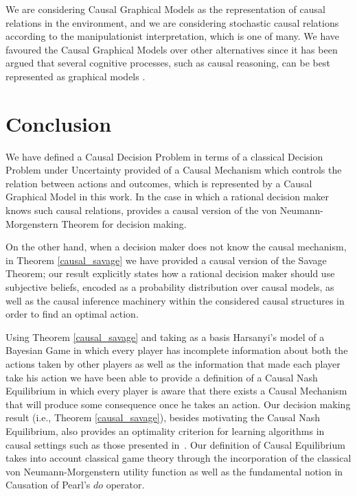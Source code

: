 \documentclass{svjour3}                     %
\begin{document}
We are considering Causal Graphical Models as the representation of causal relations in the environment, and we are considering stochastic causal relations according to the manipulationist interpretation, which is one of many. We have favoured the Causal Graphical Models over other alternatives since it has been argued that several cognitive processes, such as causal reasoning, can be best represented as graphical models \cite{danks2014unifying,sloman2015causality,hagmayer2016causal}.

\section{Conclusion}
\label{conclusion}
We have defined a Causal Decision Problem in terms of a classical Decision Problem under Uncertainty provided of a Causal Mechanism which controls the relation between actions and outcomes, which is represented by a Causal Graphical Model in this work. In the case in which a rational decision maker knows such causal relations, \cite{pearl2009causality} provides a causal version of the von Neumann-Morgenstern Theorem for decision making. 

On the other hand, when a decision maker does not know the causal mechanism, in Theorem \ref{causal_savage} we have provided a causal version of the Savage Theorem; our result explicitly states how a rational decision maker should use subjective beliefs, encoded as a probability distribution over causal models, as well as the causal inference machinery within the considered causal structures in order to find an optimal action.

Using Theorem \ref{causal_savage} and taking as a basis Harsanyi's model of a Bayesian Game in which every player has incomplete information about both the actions taken by other players as well as the information that made each player take his action we have been able to provide a definition of a Causal Nash Equilibrium in which every player is aware that there exists a Causal Mechanism that will produce some consequence once he takes an action. Our decision making result (i.e., Theorem \ref{causal_savage}), besides motivating the Causal Nash Equilibrium, also provides an optimality criterion for learning algorithms in causal settings such as those presented in~\cite{lattimoreNIPS2016,sen2017identifying}. Our definition of Causal Equilibrium takes into account classical game theory through the incorporation of the classical von Neumann-Morgenstern utility function as well as the fundamental notion in Causation of Pearl's $do$ operator. 
\end{document}

